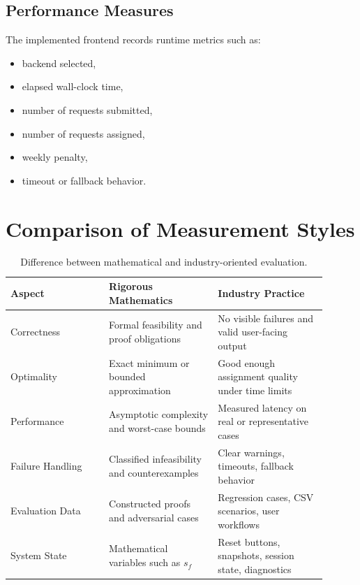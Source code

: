 \documentclass[12pt,a4paper]{article}
\begin{document}
\subsection{Performance Measures}

The implemented frontend records runtime metrics such as:

\begin{itemize}[noitemsep]
    \item backend selected,
    \item elapsed wall-clock time,
    \item number of requests submitted,
    \item number of requests assigned,
    \item weekly penalty,
    \item timeout or fallback behavior.
\end{itemize}

\section{Comparison of Measurement Styles}

\begin{table}[h]
\centering
\renewcommand{\arraystretch}{1.25}
\begin{tabular}{p{0.28\linewidth} p{0.31\linewidth} p{0.31\linewidth}}
\toprule
\textbf{Aspect} & \textbf{Rigorous Mathematics} & \textbf{Industry Practice} \\
\midrule
Correctness & Formal feasibility and proof obligations & No visible failures and valid user-facing output \\
Optimality & Exact minimum or bounded approximation & Good enough assignment quality under time limits \\
Performance & Asymptotic complexity and worst-case bounds & Measured latency on real or representative cases \\
Failure Handling & Classified infeasibility and counterexamples & Clear warnings, timeouts, fallback behavior \\
Evaluation Data & Constructed proofs and adversarial cases & Regression cases, CSV scenarios, user workflows \\
System State & Mathematical variables such as $s_f$ & Reset buttons, snapshots, session state, diagnostics \\
\bottomrule
\end{tabular}
\caption{Difference between mathematical and industry-oriented evaluation.}
\end{table}
\end{document}

